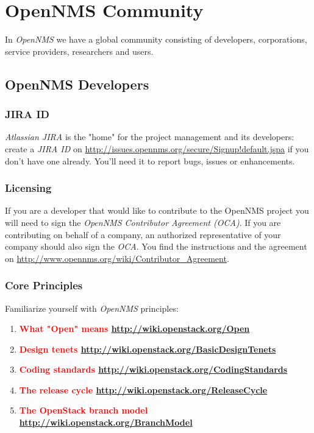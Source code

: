 \section{OpenNMS Community}
In \emph{OpenNMS} we have a global community consisting of developers, corporations, service providers, researchers and users.

\subsection{OpenNMS Developers}

\subsubsection{JIRA ID}
\emph{Atlassian JIRA} is the "home" for the project management and its developers: create a \emph{JIRA ID} on \url{http://issues.opennms.org/secure/Signup!default.jspa} if you don’t have one already. You’ll need it to report bugs, issues or enhancements.

\subsubsection{Licensing}
If you are a developer that would like to contribute to the OpenNMS project you will need to sign the \emph{OpenNMS Contributor Agreement (OCA)}. If you are contributing on behalf of a company, an authorized representative of your company should also sign the \emph{OCA}. You find the instructions and the agreement on \url{http://www.opennms.org/wiki/Contributor_Agreement}.


\subsubsection{Core Principles}
Familiarize yourself with \emph{OpenNMS} principles:
\begin{enumerate}
  \item \textbf{\textcolor{red}{What "Open" means \url{http://wiki.openstack.org/Open}}}
  \item \textbf{\textcolor{red}{Design tenets \url{http://wiki.openstack.org/BasicDesignTenets}}}
  \item \textbf{\textcolor{red}{Coding standards \url{http://wiki.openstack.org/CodingStandards}}}
  \item \textbf{\textcolor{red}{The release cycle \url{http://wiki.openstack.org/ReleaseCycle}}}
  \item \textbf{\textcolor{red}{The OpenStack branch model \url{http://wiki.openstack.org/BranchModel}}}
\end{enumerate}

